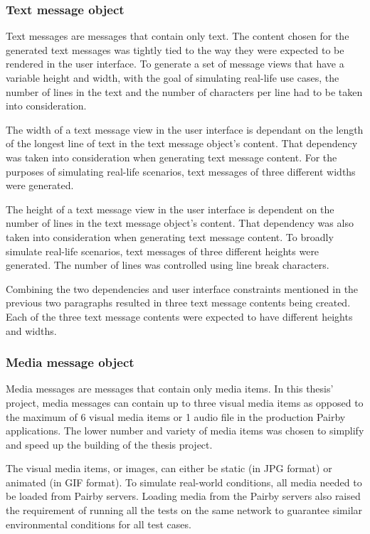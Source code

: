 \documentclass[a4paper,12pt]{article}
\begin{document}
\subsubsection{Text message object}
\label{subsec:text-message-object}
Text messages are messages that contain only text. The content chosen for the generated text messages was tightly tied to the way they were expected to be rendered in the user interface. To generate a set of message views that have a variable height and width, with the goal of simulating real-life use cases, the number of lines in the text and the number of characters per line had to be taken into consideration.

The width of a text message view in the user interface is dependant on the length of the longest line of text in the text message object's content. That dependency was taken into consideration when generating text message content. For the purposes of simulating real-life scenarios, text messages of three different widths were generated.

The height of a text message view in the user interface is dependent on the number of lines in the text message object's content. That dependency was also taken into consideration when generating text message content. To broadly simulate real-life scenarios, text messages of three different heights were generated. The number of lines was controlled using line break characters.

Combining the two dependencies and user interface constraints mentioned in the previous two paragraphs resulted in three text message contents being created. Each of the three text message contents were expected to have different heights and widths.

\subsubsection{Media message object}
\label{subsec:media-message-object}
Media messages are messages that contain only media items. In this thesis' project, media messages can contain up to three visual media items as opposed to the maximum of 6 visual media items or 1 audio file in the production Pairby applications. The lower number and variety of media items was chosen to simplify and speed up the building of the thesis project.

The visual media items, or images, can either be static (in JPG format) or animated (in GIF format). To simulate real-world conditions, all media needed to be loaded from Pairby servers. Loading media from the Pairby servers also raised the requirement of running all the tests on the same network to guarantee similar environmental conditions for all test cases.
\end{document}
